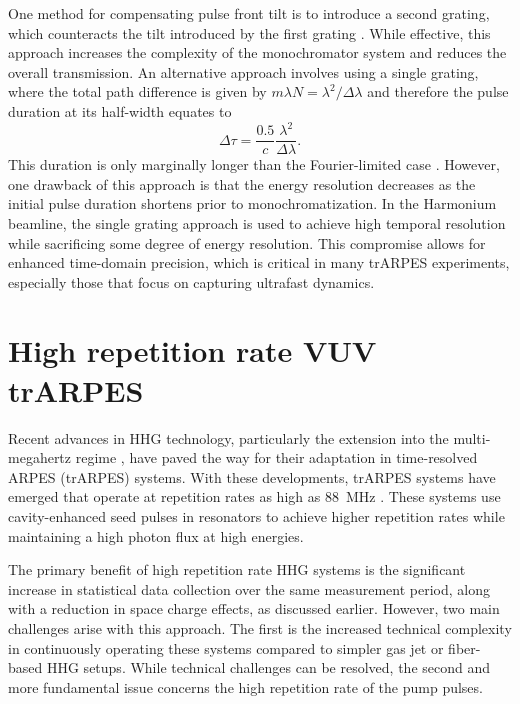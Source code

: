 One method for compensating pulse front tilt is to introduce a second grating, which counteracts the tilt introduced by the first grating \cite{villoresi_compensation_1999}.
While effective, this approach increases the complexity of the monochromator system and reduces the overall transmission.
An alternative approach involves using a single grating, where the total path difference is given by $m\lambda N=\lambda^2/\Delta\lambda$ \cite{samson_j_a_vacuum_1998} and therefore the pulse duration at its half-width equates to
\begin{equation}
	\Delta\tau = \frac{0.5}{c}\frac{\lambda^2}{\Delta\lambda}.
\end{equation}
This duration is only marginally longer than the Fourier-limited case \cite{poletto_time-preserving_2010,nugent-glandorf_laser-based_2002,poletto_time-compensated_2004,poletto_time-delay_2006}.
However, one drawback of this approach is that the energy resolution decreases as the initial pulse duration shortens prior to monochromatization.
In the Harmonium beamline, the single grating approach is used to achieve high temporal resolution while sacrificing some degree of energy resolution.
This compromise allows for enhanced time-domain precision, which is critical in many trARPES experiments, especially those that focus on capturing ultrafast dynamics.

\section{High repetition rate VUV trARPES}
\label{sec:high_rep_vuv}

Recent advances in HHG technology, particularly the extension into the multi-megahertz regime \cite{mills_xuv_2012,hadrich_high_2014,pronin_high-power_2015,saraceno_toward_2015,hadrich_single-pass_2016,carstens_high-harmonic_2016,zhao_efficient_2018}, have paved the way for their adaptation in time-resolved ARPES (trARPES) systems.
With these developments, trARPES systems have emerged that operate at repetition rates as high as \qty{88}{\mega\hertz} \cite{corder_ultrafast_2018,mills_cavity-enhanced_2019}.
These systems use cavity-enhanced seed pulses in resonators to achieve higher repetition rates while maintaining a high photon flux at high energies.

The primary benefit of high repetition rate HHG systems is the significant increase in statistical data collection over the same measurement period, along with a reduction in space charge effects, as discussed earlier.
However, two main challenges arise with this approach.
The first is the increased technical complexity in continuously operating these systems compared to simpler gas jet or fiber-based HHG setups.
While technical challenges can be resolved, the second and more fundamental issue concerns the high repetition rate of the pump pulses.

